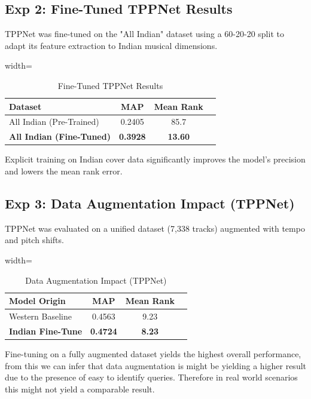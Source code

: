 \documentclass[conference]{IEEEtran}
\begin{document}
\subsection{Exp 2: Fine-Tuned TPPNet Results}
TPPNet was fine-tuned on the "All Indian" dataset using a 60-20-20 split to adapt its feature extraction to Indian musical dimensions.

\begin{table}[htbp]
    \caption{Fine-Tuned TPPNet Results}
    \centering
    \begin{adjustbox}{width=\columnwidth}
    \begin{tabular}{lccc}
    \toprule
    \textbf{Dataset} & \textbf{MAP} & \textbf{Mean Rank}  \\
    \midrule
    All Indian (Pre-Trained) & 0.2405 & 85.7  \\
    \textbf{All Indian (Fine-Tuned)} & \textbf{0.3928} & \textbf{13.60}  \\
    \bottomrule
    \end{tabular}
    \end{adjustbox}
\end{table}
 Explicit training on Indian cover data significantly improves the model's precision and lowers the mean rank error.

\subsection{Exp 3: Data Augmentation Impact (TPPNet)}
TPPNet was evaluated on a unified dataset (7,338 tracks) augmented with tempo and pitch shifts.

\begin{table}[htbp]
    \caption{Data Augmentation Impact (TPPNet)}
    \centering
    \begin{adjustbox}{width=\columnwidth}
    \begin{tabular}{lccc}
    \toprule
    \textbf{Model Origin} & \textbf{MAP} & \textbf{Mean Rank} &  \\
    \midrule
    Western Baseline & 0.4563 & 9.23\\
    \textbf{Indian Fine-Tune} & \textbf{0.4724} & \textbf{8.23}  \\
    \bottomrule
    \end{tabular}
    \end{adjustbox}
\end{table}
Fine-tuning on a fully augmented dataset yields the highest overall performance, from this we can infer that data augmentation is might be yielding a higher result due to the presence of easy to identify queries. Therefore in real world scenarios this might not yield a comparable result.
\end{document}
